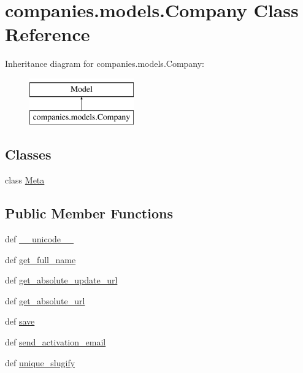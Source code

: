 \hypertarget{classcompanies_1_1models_1_1_company}{\section{companies.\-models.\-Company Class Reference}
\label{classcompanies_1_1models_1_1_company}
}
Inheritance diagram for companies.\-models.\-Company\-:\begin{figure}[H]
\begin{center}
\leavevmode
\includegraphics[height=2.000000cm]{classcompanies_1_1models_1_1_company}
\end{center}
\end{figure}
\subsection*{Classes}
\begin{DoxyCompactItemize}
\item 
class \hyperlink{classcompanies_1_1models_1_1_company_1_1_meta}{Meta}
\end{DoxyCompactItemize}
\subsection*{Public Member Functions}
\begin{DoxyCompactItemize}
\item 
def \hyperlink{classcompanies_1_1models_1_1_company_ae197be26d4dab6fa54eb593904bb3f37}{\-\_\-\-\_\-unicode\-\_\-\-\_\-}
\item 
def \hyperlink{classcompanies_1_1models_1_1_company_a2f85f2cc73d79bd368a5c1b123bbbf6d}{get\-\_\-full\-\_\-name}
\item 
def \hyperlink{classcompanies_1_1models_1_1_company_ac40eac17f0ba4882ccfa34fd26c4548b}{get\-\_\-absolute\-\_\-update\-\_\-url}
\item 
def \hyperlink{classcompanies_1_1models_1_1_company_a2e7ad6ff77408ac7fe215b8cdd3be379}{get\-\_\-absolute\-\_\-url}
\item 
def \hyperlink{classcompanies_1_1models_1_1_company_a1918dcc5d1cd9e026a10b59b81d3be58}{save}
\item 
def \hyperlink{classcompanies_1_1models_1_1_company_a7b052d7596ddd41cdadaedadbae2020b}{send\-\_\-activation\-\_\-email}
\item 
def \hyperlink{classcompanies_1_1models_1_1_company_a1a3a291ee0aea79524eddf7cd16157c3}{unique\-\_\-slugify}
\end{DoxyCompactItemize}

